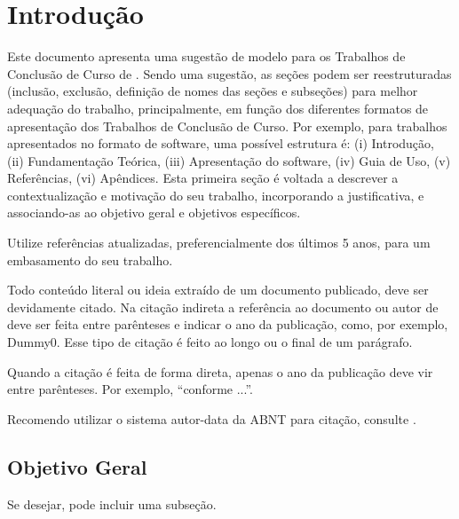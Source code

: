 \section{Introdução}

Este documento apresenta uma sugestão de modelo para os Trabalhos de Conclusão de Curso de \curso.
Sendo uma sugestão, as seções podem ser reestruturadas (inclusão, exclusão, definição de nomes das seções e
subseções) para melhor adequação do trabalho, principalmente, em função dos diferentes formatos de apresentação dos Trabalhos de Conclusão de Curso.
Por exemplo, para trabalhos apresentados no formato de software, uma possível estrutura é: (i) Introdução, (ii) Fundamentação Teórica, (iii) Apresentação do software, (iv) Guia de Uso, (v) Referências, (vi) Apêndices.
Esta primeira seção é voltada a descrever a contextualização e motivação do seu trabalho, incorporando a justificativa, e associando-as ao objetivo geral e objetivos específicos.

Utilize referências atualizadas, preferencialmente dos últimos 5 anos, para um embasamento do seu trabalho.

Todo conteúdo literal ou ideia extraído de um documento publicado, deve ser devidamente citado.
Na citação indireta a referência ao documento ou autor de deve ser feita entre parênteses e indicar o ano da publicação, como, por exemplo, Dummy0.
Esse tipo de citação é feito ao longo ou o final de um parágrafo.

Quando a citação é feita de forma direta, apenas o ano da publicação deve vir entre parênteses.
Por exemplo, “conforme \cite{krenz2005} ...”.

Recomendo utilizar o sistema autor-data da ABNT para citação, consulte \cite{lubisco2019}.

\subsection{Objetivo Geral}

Se desejar, pode incluir uma subseção.

